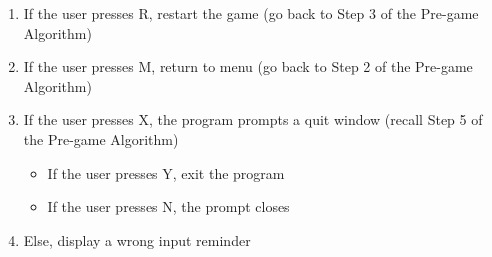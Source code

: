 \begin{enumerate}
        \begin{enumerate}[label=\alph*]
            \item If the user presses R, restart the game (go back to Step 3 of the Pre-game Algorithm)
            \item If the user presses M, return to menu (go back to Step 2 of the Pre-game Algorithm)
            \item If the user presses X, the program prompts a quit window (recall Step 5 of the Pre-game Algorithm)
                \begin{itemize}[label={}]
                    \item If the user presses Y, exit the program
                    \item If the user presses N, the prompt closes
                \end{itemize}
            \item Else, display a wrong input reminder
        \end{enumerate}
\end{enumerate}
